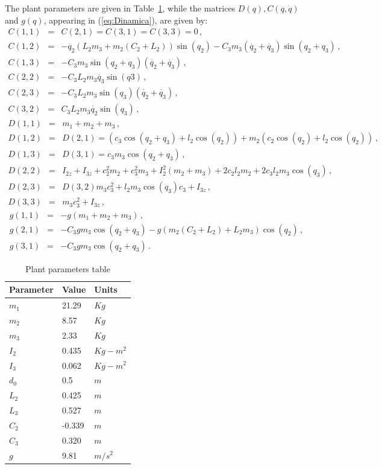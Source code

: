 \documentclass[letterpaper, 10 pt, conference]{ieeeconf}  %
\theoremstyle{plain}
\theoremstyle{definition}
\theoremstyle{remark}
\begin{document}
The plant parameters are given in Table~\ref{table:actual}, while the matrices $D(q), C(q,\dot{q})$ and $g(q)$, appearing in (\ref{eq:Dinamica}), are given by:
%
\begin{eqnarray}
C(1,1) &=&  C(2,1) = C(3,1)=C(3,3)=0\,, \nonumber\\
C(1,2) & =& -\dot{q_2}(L_2m_3+m_2(C_2+L_2)) \sin(q_2)-C_3m_3(\dot{q_2}+\dot{q_3}) \sin(q_2+q_3)\,, \nonumber\\
C(1,3) &=&  -C_3 m_3 \sin(q_2+q_3)(\dot{q_2}+\dot{q_3})\,, \nonumber\\
C(2,2) &=&  -C_3 L_2 m_3\dot{q_3} \sin(q3)\,, \nonumber\\
C(2,3) &=&  -C_3 L_2 m_3 \sin(q_3)(\dot{q_2}+\dot{q_3})\,, \nonumber\\
C(3,2) &=&  C_3 L_2 m_3\dot{q_2} \sin(q_3)\,,\label{eq:defC}
\end{eqnarray}
%
%
\begin{eqnarray}
D(1,1) &=& m_1 + m_2 + m_3 \,, \nonumber \\
D(1,2) &=& D(2,1) = (c_3 \cos(q_2+q_3) + l_2 \cos(q_2)) + m_2 (c_2 \cos(q_2) + l_2 \cos (q_2) )\,, \nonumber \\
D(1,3) &=& D(3,1) = c_3 m_3 \cos( q_2 + q_3) \,, \nonumber \\
D(2,2) &=& I_{2z} + I_{3z} + c_2^2 m_2 + c_3^2 m_3 + I_2^2 (m_2 + m_3) + 2 c_2 l_2 m_2 + 2 c_3 l_2 m_3 \cos (q_3)\,, \nonumber\\
D(2,3) &=& D(3,2) m_3 c_3^2 + l_2 m_3 \cos (q_3 ) c_3 + I_{3z} \,,\nonumber \\
D(3,3) &=&  m_3 c_3^2 + I_{3z}\,,\label{eq:defD}
\end{eqnarray}
%
\begin{eqnarray}
g(1,1) &=&  -g(m_1+m_2+m_3)\,, \nonumber\\
g(2,1) &=&  -C_3 g m_3 \cos(q_2+q_3)-g (m_2(C_2+L_2)+L_2 m_3) \cos(q_2)\,, \nonumber\\
g(3,1) &=&  -C_3 g m_3 \cos(q_2+q_3)\,.
\label{eq:defg}
\end{eqnarray}
%
\begin{table}[h!]
\centering
\caption{Plant parameters table}
\begin{tabular}{ |p{3cm} p{3cm} p{3cm}|  }
 \hline
 Parameter & Value & Units\\
 \hline
	$m_1$ & 21.29 & $Kg$\\
	$m_2$ & 8.57 & $Kg$\\
	$m_3$ & 2.33 & $Kg$\\
	$I_2$ & 0.435 & $Kg-m^2$\\
	$I_3$ & 0.062 & $Kg-m^2$\\
	$d_0$ & 0.5 & $m$ \\
	$L_2$ & 0.425 & $m$ \\
	$L_3$ & 0.527 & $m$ \\
	$C_2$ & -0.339 & $m$ \\
	$C_3$ & 0.320 & $m$ \\
	$g$ & 9.81 & $m/s^2$ \\
\hline
\end{tabular}
\label{table:actual} 
\end{table}
\end{document}
